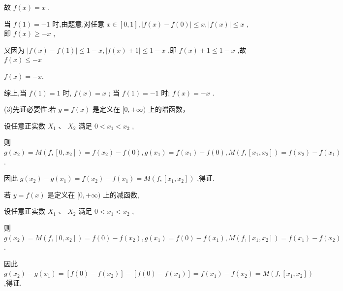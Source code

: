 \documentclass[10pt]{article}
\begin{document}
故 \(f\left( x\right)  = x\) .

当 \(f\left( 1\right)  =  - 1\) 时,由题意,对任意 \(x \in  \left\lbrack  {0,1}\right\rbrack  ,\left| {f\left( x\right)  - f\left( 0\right) }\right|  \leq  x,\left| {f\left( x\right) }\right|  \leq  x\) ,即 \(f\left( x\right)  \geq   - x\) ,

又因为 \(\left| {f\left( x\right)  - f\left( 1\right) }\right|  \leq  1 - x,\left| {f\left( x\right)  + 1}\right|  \leq  1 - x\) ,即 \(f\left( x\right)  + 1 \leq  1 - x\) ,故 \(f\left( x\right)  \leq   - x\)

\(f\left( x\right)  =  - x.\)

综上,当 \(f\left( 1\right)  = 1\) 时, \(f\left( x\right)  = x\) ; 当 \(f\left( 1\right)  =  - 1\) 时; \(f\left( x\right)  =  - x\) .

(3)先证必要性:若 \(y = f\left( x\right)\) 是定义在 \(\lbrack 0, + \infty )\) 上的增函数，

设任意正实数 \({X}_{1}\text{ 、 }{X}_{2}\) 满足 \(0 < {x}_{1} < {x}_{2}\) ,

则 \(g\left( {x}_{2}\right)  = M\left( {f,\left\lbrack  {0,{x}_{2}}\right\rbrack  }\right)  = f\left( {x}_{2}\right)  - f\left( 0\right) ,g\left( {x}_{1}\right)  = f\left( {x}_{1}\right)  - f\left( 0\right) ,M\left( {f,\left\lbrack  {{x}_{1},{x}_{2}}\right\rbrack  }\right)  = f\left( {x}_{2}\right)  - f\left( {x}_{1}\right)\) .

因此 \(g\left( {x}_{2}\right)  - g\left( {x}_{1}\right)  = f\left( {x}_{2}\right)  - f\left( {x}_{1}\right)  = M\left( {f,\left\lbrack  {{x}_{1},{x}_{2}}\right\rbrack  }\right)\) ,得证.

若 \(y = f\left( x\right)\) 是定义在 \(\lbrack 0, + \infty )\) 上的减函数,

设任意正实数 \({X}_{1}\text{ 、 }{X}_{2}\) 满足 \(0 < {x}_{1} < {x}_{2}\) ,

则 \(g\left( {x}_{2}\right)  = M\left( {f,\left\lbrack  {0,{x}_{2}}\right\rbrack  }\right)  = f\left( 0\right)  - f\left( {x}_{2}\right) ,g\left( {x}_{1}\right)  = f\left( 0\right)  - f\left( {x}_{1}\right) ,M\left( {f,\left\lbrack  {{x}_{1},{x}_{2}}\right\rbrack  }\right)  = f\left( {x}_{1}\right)  - f\left( {x}_{2}\right)\) .

因此 \(g\left( {x}_{2}\right)  - g\left( {x}_{1}\right)  = \left\lbrack  {f\left( 0\right)  - f\left( {x}_{2}\right) }\right\rbrack   - \left\lbrack  {f\left( 0\right)  - f\left( {x}_{1}\right) }\right\rbrack   = f\left( {x}_{1}\right)  - f\left( {x}_{2}\right)  = M\left( {f,\left\lbrack  {{x}_{1},{x}_{2}}\right\rbrack  }\right)\) ,得证.
\end{document}
